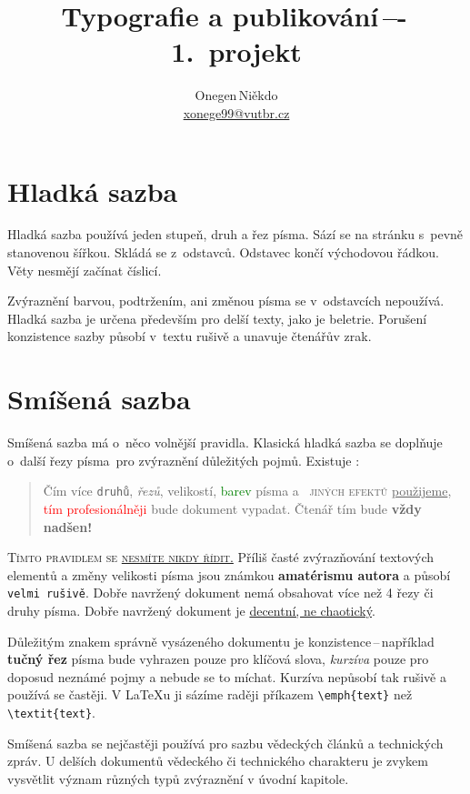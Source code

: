 \documentclass[a4paper, twocolumn, 10pt]{article}
\title{Typografie a publikování\,–-\,1.\ projekt}
\author{Onegen\,Niěkdo \\
    \href{mailto:xonege99@vutbr.cz}{xonege99@vutbr.cz}}
\date{}
\begin{document}
\maketitle

\section{Hladká sazba}

Hladká sazba používá jeden stupeň, druh a řez písma.
Sází se na stránku s~pevně stanovenou šířkou.
Skládá se z~odstavců. Odstavec končí východovou řádkou.
Věty nesmějí začínat číslicí. \par
Zvýraznění barvou, podtržením, ani změnou písma se v~odstavcích nepoužívá.
Hladká sazba je určena především pro delší texty, jako je beletrie.
Porušení konzistence sazby působí v~textu rušivě a unavuje čtenářův zrak.

\section{Smíšená sazba}

Smíšená sazba má o~něco volnější pravidla. Klasická hladká
sazba se doplňuje o~další řezy písma~pro zvýraznění důležitých pojmů.
Existuje :

\begin{quotation}

	Čím více \texttt{druhů}, \textit{řezů}, {\tiny velikostí}, \textcolor{green}{barev} písma
	a~{\scshape\color{blue} jiných efektů} \underline{použijeme}, \textcolor{red}{tím profesionál\-něji}
	bude {\selectfont dokument} vypadat. Čtenář tím bude
		{\Huge \textbf{vždy nadšen!}}

\end{quotation}

{\scshape Tímto pravidlem se \underline{nesmíte nikdy řídit.}}
Příliš časté zvýrazňování textových elementů a změny {\scriptsize velikosti} písma
jsou známkou \textbf{amatérismu autora} a působí \texttt{velmi rušivě}.
Dobře navržený dokument nemá obsahovat více než 4 řezy či druhy písma.
Dobře navržený dokument je \underline{decentní, ne chaotický}.

Důležitým znakem správně vysázeného dokumentu je konzistence\,--\,například
\textbf{tučný řez} písma bude vyhrazen pouze pro klíčová slova,
\emph{kurzíva} pouze pro doposud neznámé pojmy a nebude se to míchat.
Kurzíva nepůsobí tak rušivě a používá se častěji.
V \LaTeX{}u ji sázíme raději příkazem {\ttfamily \verb|\emph{text}|} než {\ttfamily \verb|\textit{text}|}.

Smíšená sazba se nejčastěji používá pro sazbu vědeckých článků a technických zpráv.
U delších dokumentů vědeckého či technického charakteru je zvykem
vysvětlit význam různých typů zvýraznění v úvodní kapitole.
\end{document}
